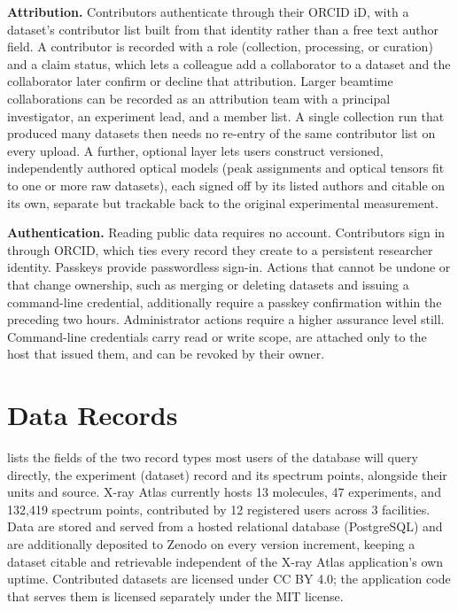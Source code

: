 \textbf{Attribution.} Contributors authenticate through their ORCID iD, with a dataset's contributor list built from that identity rather than a free text author field. A contributor is recorded with a role (collection, processing, or curation) and a claim status, which lets a colleague add a collaborator to a dataset and the collaborator later confirm or decline that attribution. Larger beamtime collaborations can be recorded as an attribution team with a principal investigator, an experiment lead, and a member list. A single collection run that produced many datasets then needs no re-entry of the same contributor list on every upload. A further, optional layer lets users construct versioned, independently authored optical models (peak assignments and optical tensors fit to one or more raw datasets), each signed off by its listed authors and citable on its own, separate but trackable back to the original experimental measurement.

\textbf{Authentication.} Reading public data requires no account. Contributors sign in through ORCID, which ties every record they create to a persistent researcher identity. Passkeys provide passwordless sign-in. Actions that cannot be undone or that change ownership, such as merging or deleting datasets and issuing a command-line credential, additionally require a passkey confirmation within the preceding two hours. Administrator actions require a higher assurance level still. Command-line credentials carry read or write scope, are attached only to the host that issued them, and can be revoked by their owner.

\section{Data Records}\label{sec:data-records}

 lists the fields of the two record types most users of the database will query directly, the experiment (dataset) record and its spectrum points, alongside their units and source. X-ray Atlas currently hosts 13 molecules, 47 experiments, and 132,419 spectrum points, contributed by 12 registered users across 3 facilities. Data are stored and served from a hosted relational database (PostgreSQL) and are additionally deposited to Zenodo on every version increment, keeping a dataset citable and retrievable independent of the X-ray Atlas application's own uptime. Contributed datasets are licensed under CC BY 4.0; the application code that serves them is licensed separately under the MIT license.

